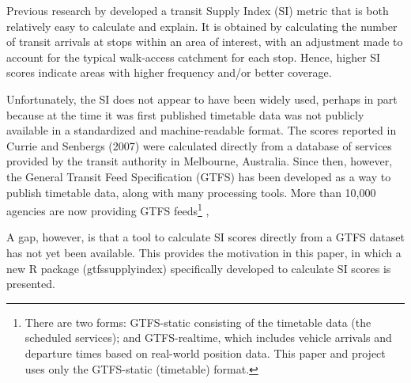 \documentclass[preprint, 3p,
authoryear]{elsarticle} %
\begin{document}
Previous research by \citet{currie2007identifying} developed a transit
Supply Index (SI) metric that is both relatively easy to calculate and
explain. It is obtained by calculating the number of transit arrivals at
stops within an area of interest, with an adjustment made to account for
the typical walk-access catchment for each stop. Hence, higher SI scores
indicate areas with higher frequency and/or better coverage.

Unfortunately, the SI does not appear to have been widely used, perhaps
in part because at the time it was first published timetable data was
not publicly available in a standardized and machine-readable format.
The scores reported in Currie and Senbergs (2007) were calculated
directly from a database of services provided by the transit authority
in Melbourne, Australia. Since then, however, the General Transit Feed
Specification (GTFS) has been developed as a way to publish timetable
data, along with many processing tools. More than 10,000 agencies are
now providing GTFS feeds\footnote{There are two forms: GTFS-static
  consisting of the timetable data (the scheduled services); and
  GTFS-realtime, which includes vehicle arrivals and departure times
  based on real-world position data. This paper and project uses only
  the GTFS-static (timetable) format.} \citep{GTFS},

A gap, however, is that a tool to calculate SI scores directly from a
GTFS dataset has not yet been available. This provides the motivation in
this paper, in which a new R package (gtfssupplyindex) specifically
developed to calculate SI scores is presented.

\renewcommand\refname{References}

\end{document}
